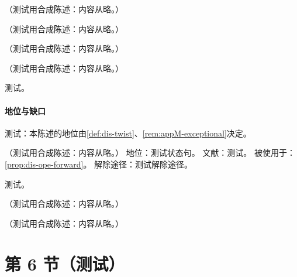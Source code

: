 \begin{remark}[未识别的多项式项]\label{rem:appM-polynomial}
（测试用合成陈述：内容从略。）
\end{remark}

\begin{remark}\label{rem:appM-remainder-reduction}
（测试用合成陈述：内容从略。）
\end{remark}

\begin{remark}[例外动量与前向矩阵元]\label{rem:appM-exceptional}
（测试用合成陈述：内容从略。）
\end{remark}

\begin{proposition}\label{prop:appM-zero-momentum-insertion}
（测试用合成陈述：内容从略。）
\end{proposition}
\begin{proofsketch}测试。\end{proofsketch}
\paragraph{地位与缺口}测试：本陈述的地位由\cref{def:dis-twist}、\cref{rem:appM-exceptional}决定。

\begin{assumption}\label{asm:appM-forward}
（测试用合成陈述：内容从略。）
地位：测试状态句。
文献：测试。
被使用于：\cref{prop:dis-ope-forward}。
解除途径：测试解除途径。
\end{assumption}
\begin{proofsketch}测试。\end{proofsketch}

\begin{definition}\label{def:appM-alien}
（测试用合成陈述：内容从略。）
\end{definition}

\begin{theorem}\label{thm:appM-local-cohomology}
（测试用合成陈述：内容从略。）
\end{theorem}

\section{第 6 节（测试）}\label{sec:appM-brst}

